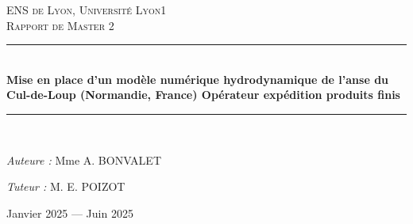 \documentclass[10pt,a4paper,titlepage]{article}
\newcommand{\HRule}{\rule{\linewidth}{0.5mm}}
\begin{document}
  \begin{titlepage}
      \begin{sffamily}
          \begin{center}


              \textsc{\LARGE ENS de Lyon, Université Lyon1}\\[2cm]

              \textsc{\Large Rapport de Master 2}\\[1.5cm]

              \HRule \\[0.4cm]
              { \huge \bfseries Mise en place d’un modèle numérique hydrodynamique de l’anse du Cul-de-Loup (Normandie, France) Opérateur expédition produits finis\\ [0.4cm] }

              \HRule \\[2cm]

              \begin{minipage}{0.4\textwidth}
                  \begin{flushleft} \large
                      \emph{Auteure :} Mme \textsc{A. BONVALET}\\
                  \end{flushleft}
              \end{minipage}
              \begin{minipage}{0.4\textwidth}
                  \begin{flushright} \large
                      \emph{Tuteur :} M. \textsc{E. POIZOT}\\
                  \end{flushright}
              \end{minipage}

              \vfill

              {\large Janvier 2025 — Juin 2025}

          \end{center}
      \end{sffamily}
  \end{titlepage}
\end{document}
